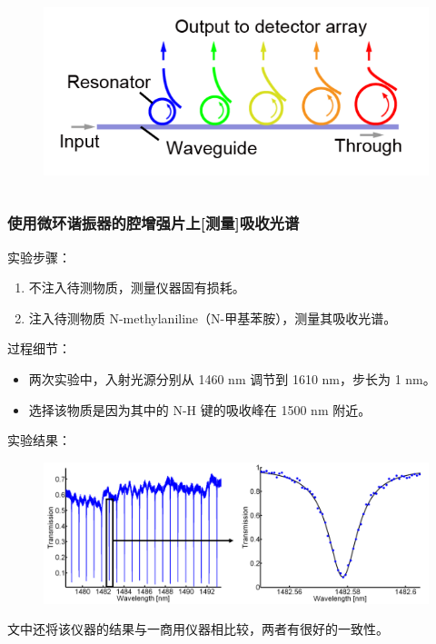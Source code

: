\begin{frame}[c]
\begin{columns}
\begin{column}{.5\textwidth}
\begin{figure}[H]
                \includegraphics[width=1.\textwidth]{figures/Cavity-enhanced on-chip absorption spectroscopy using microring resonators_2.png} %
            \end{figure}
        \end{column}
    \end{columns}
\end{frame}

\begin{frame}[c]
    \frametitle{使用微环谐振器的腔增强片上[测量]吸收光谱}
    实验步骤：
    \begin{enumerate}
        \item 不注入待测物质，测量仪器固有损耗。
        \item 注入待测物质 N-methylaniline（N-甲基苯胺），测量其吸收光谱。
    \end{enumerate}
    过程细节：
    \begin{itemize}
        \item 两次实验中，入射光源分别从 1460 nm 调节到 1610 nm，步长为 1 nm。
        \item 选择该物质是因为其中的 N-H 键的吸收峰在 1500 nm 附近。
    \end{itemize}
    实验结果：
    \begin{figure}[H] %
        \centering %
        \includegraphics[width=1.\textwidth]{figures/Cavity-enhanced on-chip absorption spectroscopy using microring resonators_3.png} %
    \end{figure}
    文中还将该仪器的结果与一商用仪器相比较，两者有很好的一致性。
\end{frame}